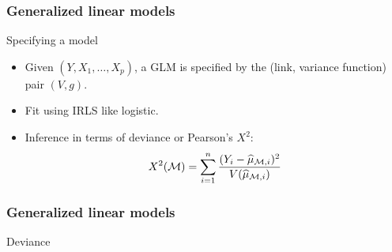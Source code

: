 \documentclass[handout]{beamer}
\begin{document}
   \begin{frame} \frametitle{Generalized linear models}

   \begin{block}
         {Specifying a model}
         \begin{itemize}
         \item Given $(Y, X_1, \dots, X_p)$, a GLM is specified by the
   (link, variance function) pair $(V, g)$.

   \item Fit using IRLS like logistic.

   \item Inference in terms of deviance or Pearson's $X^2$:
   $$
   X^2({\cal M}) = \sum_{i=1}^n \frac{(Y_i - \widehat{\mu}_{{\cal M},i})^2}{V(\widehat{\mu}_{{\cal M},i})}$$
         \end{itemize}
   \end{block}
   \end{frame}


   \begin{frame} \frametitle{Generalized linear models}

   \begin{block}
         {Deviance}
   \end{block}
   \end{frame}

\end{document}
